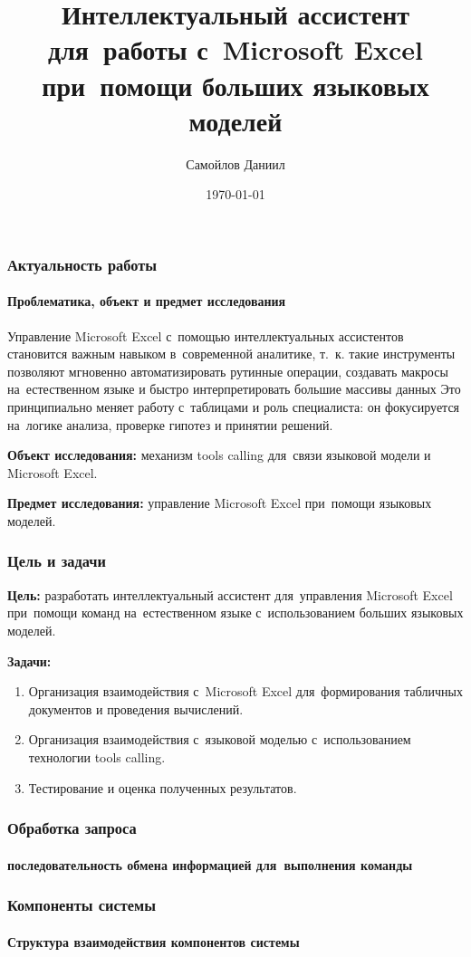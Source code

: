 \documentclass{beamer}
\title{Интеллектуальный ассистент для~работы с~Microsoft Excel при~помощи больших языковых моделей}
\author{Самойлов Даниил}
\date{\today}
\begin{document}
\maketitle

\begin{frame}
\frametitle{Актуальность работы}
\framesubtitle{Проблематика, объект и предмет  исследования}

Управление Microsoft Excel с~помощью интеллектуальных ассистентов становится важным навыком в~современной аналитике,
т.~к. такие инструменты позволяют мгновенно автоматизировать рутинные операции, создавать макросы на~естественном языке и быстро интерпретировать большие массивы данных
Это принципиально меняет работу с~таблицами и роль специалиста:
он фокусируется на~логике анализа, проверке гипотез и принятии решений.

{\bf Объект исследования:} механизм tools calling для~связи языковой модели и Microsoft Excel.

{\bf Предмет исследования:} управление Microsoft Excel при~помощи языковых моделей.
\end{frame}

\begin{frame}
\frametitle{Цель и задачи}

{\bf Цель:} разработать интеллектуальный ассистент для~управления Microsoft Excel при~помощи команд на~естественном языке с~использованием больших языковых моделей.

{\bf Задачи:}

\begin{enumerate}
\item {Организация взаимодействия с~Microsoft Excel для~формирования табличных документов и проведения вычислений.}
\item {Организация взаимодействия с~языковой моделью с~использованием технологии tools calling.}
\item {Тестирование и оценка полученных результатов.}
\end{enumerate}
\end{frame}

\begin{frame}
\frametitle{Обработка запроса}
\framesubtitle{последовательность обмена информацией для~выполнения команды}
\end{frame}

\begin{frame}
\frametitle{Компоненты системы}
\framesubtitle{Структура взаимодействия компонентов системы}
\end{frame}
\end{document}

